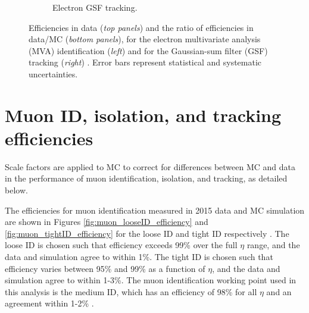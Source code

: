 \begin{figure}[h]
\begin{subfigure}{0.45\textwidth}
        \caption{Electron GSF tracking.}
        \label{fig:electron_GSF_tracking_efficiency}
    \end{subfigure}
    \caption[Efficiencies in data (\textit{top panels}) and the ratio of efficiencies in data/MC (\textit{bottom panels}), for the electron multivariate analysis (MVA) identification (\textit{left}) and for the Gaussian-sum filter (GSF) tracking (\textit{right}).]{Efficiencies in data (\textit{top panels}) and the ratio of efficiencies in data/MC (\textit{bottom panels}), for the electron multivariate analysis (MVA) identification (\textit{left}) and for the Gaussian-sum filter (GSF) tracking (\textit{right}) \cite{CMS-DP-2020-037}. Error bars represent statistical and systematic uncertainties.} 
\end{figure}


\section{Muon ID, isolation, and tracking efficiencies}
Scale factors are applied to MC to correct for differences between MC and data in the performance of muon identification, isolation, and tracking, as detailed below.

The efficiencies for muon identification measured in 2015 data and MC simulation are shown in Figures \ref{fig:muon_looseID_efficiency} and \ref{fig:muon_tightID_efficiency} for the loose ID and tight ID respectively \cite{CMS-MUO-16-001}. The loose ID is chosen such that efficiency exceeds 99\% over the full $\eta$ range, and the data and simulation agree to within 1\%. The tight ID is chosen such that efficiency varies between 95\% and 99\% as a function of $\eta$, and the data and simulation agree to within 1-3\%. The muon identification working point used in this analysis is the medium ID, which has an efficiency of 98\% for all $\eta$ and an agreement within 1-2\% \cite{CMS-MUO-16-001}. 

